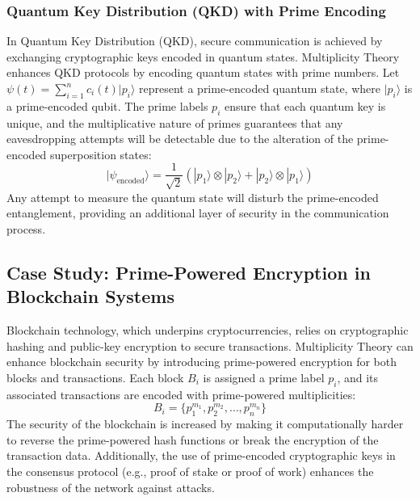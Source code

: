 \documentclass[%
 preprint, linenumbers,
 amsmath,amssymb,
 aps, physrev,
]{revtex4-2}
\begin{document}
\subsubsection{Quantum Key Distribution (QKD) with Prime Encoding}
In Quantum Key Distribution (QKD), secure communication is achieved by exchanging cryptographic keys encoded in quantum states. Multiplicity Theory enhances QKD protocols by encoding quantum states with prime numbers. Let \( \psi(t) = \sum_{i=1}^{n} c_i(t) | p_i \rangle \) represent a prime-encoded quantum state, where \( | p_i \rangle \) is a prime-encoded qubit. The prime labels \( p_i \) ensure that each quantum key is unique, and the multiplicative nature of primes guarantees that any eavesdropping attempts will be detectable due to the alteration of the prime-encoded superposition states:
\[
| \psi_{\text{encoded}} \rangle = \frac{1}{\sqrt{2}} (| p_1 \rangle \otimes | p_2 \rangle + | p_2 \rangle \otimes | p_1 \rangle)
\]
Any attempt to measure the quantum state will disturb the prime-encoded entanglement, providing an additional layer of security in the communication process.

\subsection{Case Study: Prime-Powered Encryption in Blockchain Systems}
Blockchain technology, which underpins cryptocurrencies, relies on cryptographic hashing and public-key encryption to secure transactions. Multiplicity Theory can enhance blockchain security by introducing prime-powered encryption for both blocks and transactions. Each block \( B_i \) is assigned a prime label \( p_i \), and its associated transactions are encoded with prime-powered multiplicities:
\[
B_i = \{p_1^{m_1}, p_2^{m_2}, \dots, p_n^{m_n}\}
\]
The security of the blockchain is increased by making it computationally harder to reverse the prime-powered hash functions or break the encryption of the transaction data. Additionally, the use of prime-encoded cryptographic keys in the consensus protocol (e.g., proof of stake or proof of work) enhances the robustness of the network against attacks.
\end{document}
